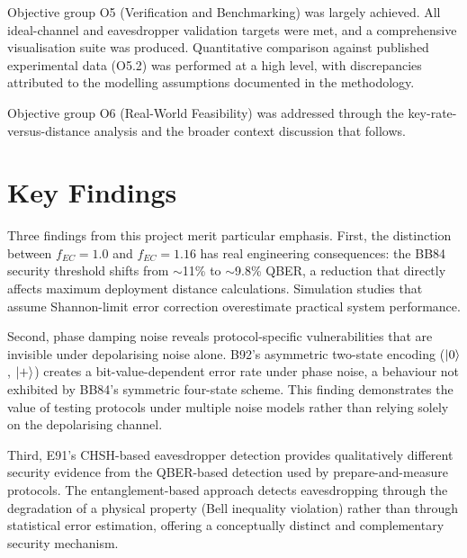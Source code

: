 \documentclass[10pt, a4paper]{report}
\begin{document}
Objective group O5 (Verification and Benchmarking) was largely achieved. All ideal-channel and eavesdropper validation targets were met, and a comprehensive visualisation suite was produced. Quantitative comparison against published experimental data (O5.2) was performed at a high level, with discrepancies attributed to the modelling assumptions documented in the methodology.

Objective group O6 (Real-World Feasibility) was addressed through the key-rate-versus-distance analysis and the broader context discussion that follows.




\section{Key Findings}

Three findings from this project merit particular emphasis. First, the distinction between $f_{EC} = 1.0$ and $f_{EC} = 1.16$ has real engineering consequences: the BB84 security threshold shifts from $\sim$11\% to $\sim$9.8\% QBER, a reduction that directly affects maximum deployment distance calculations. Simulation studies that assume Shannon-limit error correction overestimate practical system performance.

Second, phase damping noise reveals protocol-specific vulnerabilities that are invisible under depolarising noise alone. B92's asymmetric two-state encoding ($\ket{0}$, $\ket{+}$) creates a bit-value-dependent error rate under phase noise, a behaviour not exhibited by BB84's symmetric four-state scheme. This finding demonstrates the value of testing protocols under multiple noise models rather than relying solely on the depolarising channel.

Third, E91's CHSH-based eavesdropper detection provides qualitatively different security evidence from the QBER-based detection used by prepare-and-measure protocols. The entanglement-based approach detects eavesdropping through the degradation of a physical property (Bell inequality violation) rather than through statistical error estimation, offering a conceptually distinct and complementary security mechanism.
\end{document}
